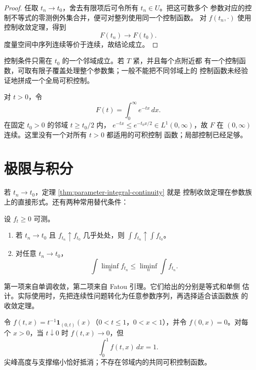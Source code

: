 \begin{proof}
任取 \(t_n\to t_0\)，舍去有限项后可令所有 \(t_n\in U\)。把这可数多个
参数对应的控制不等式的零测例外集合并，便可对整列使用同一个控制函数。
对 \(f(t_n,\cdot)\) 使用控制收敛定理，得到
\[
 F(t_n)\longrightarrow F(t_0).
\]
度量空间中序列连续等价于连续，故结论成立。
\end{proof}

控制条件只需在 \(t_0\) 的一个邻域成立。若 \(T\) 紧，并且每个点附近都
有一个控制函数，可取有限子覆盖处理整个参数集；一般不能把不同邻域上的
控制函数未经验证地拼成一个全局可积控制。

\begin{example}
对 \(t>0\)，令
\[
 F(t)=\int_0^\infty e^{-tx}\,dx.
\]
在固定 \(t_0>0\) 的邻域 \(t\ge t_0/2\) 内，
\(e^{-tx}\le e^{-t_0x/2}\in L^1(0,\infty)\)，故 \(F\) 在
\((0,\infty)\) 连续。这里没有一个对所有 \(t>0\) 都适用的可积控制
函数；局部控制已经足够。
\end{example}

\section{极限与积分}

若 \(t_n\to t_0\)，定理 \ref{thm:parameter-integral-continuity} 就是
控制收敛定理在参数族上的直接形式。还有两种常用替代条件：

\begin{proposition}
\label{prop:parameter-monotone-fatou}
设 \(f_t\ge0\) 可测。
\begin{enumerate}[label=\textup{(\roman*)}]
 \item 若 \(t_n\to t_0\) 且 \(f_{t_n}\uparrow f_{t_0}\) 几乎处处，则
 \(\int f_{t_n}\uparrow\int f_{t_0}\)。
 \item 对任意 \(t_n\to t_0\)，
 \[
  \int\liminf_n f_{t_n}\le\liminf_n\int f_{t_n}.
 \]
\end{enumerate}
\end{proposition}

第一项来自单调收敛，第二项来自 Fatou 引理。它们给出的分别是等式和单侧
估计。实际使用时，先把连续性问题转化为任意参数序列，再选择适合该函数族
的收敛定理。

\begin{counterexample}
令 \(f(t,x)=t^{-1}\mathbf1_{(0,t)}(x)\)（\(0<t\le1\)，\(0<x<1\)），并令
\(f(0,x)=0\)。对每个 \(x>0\)，当 \(t\downarrow0\) 时
\(f(t,x)\to0\)，但
\[
 \int_0^1f(t,x)\,dx=1.
\]
尖峰高度与支撑缩小恰好抵消；不存在邻域内的共同可积控制函数。
\end{counterexample}

